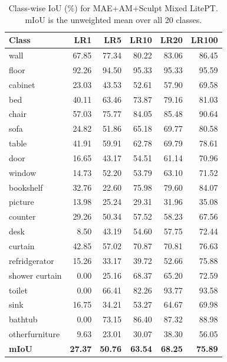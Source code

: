 \begin{table}[htbp]
\centering
\caption{Class-wise IoU (\%) for MAE+AM+Sculpt Mixed LitePT. mIoU is the unweighted mean over all 20 classes.}
\label{tab:classwise-pretrain-sculptor-litept}
\begin{tabular}{lrrrrr}
\hline
Class & LR1 & LR5 & LR10 & LR20 & LR100 \\
\hline
wall & 67.85 & 77.34 & 80.22 & 83.06 & 86.45 \\
floor & 92.26 & 94.50 & 95.33 & 95.33 & 95.59 \\
cabinet & 23.03 & 43.53 & 52.61 & 57.90 & 69.58 \\
bed & 40.11 & 63.46 & 73.87 & 79.16 & 81.03 \\
chair & 57.03 & 75.77 & 84.05 & 85.48 & 90.64 \\
sofa & 24.82 & 51.86 & 65.18 & 69.77 & 80.58 \\
table & 41.91 & 59.91 & 62.78 & 69.79 & 78.61 \\
door & 16.65 & 43.17 & 54.51 & 61.14 & 70.96 \\
window & 14.73 & 52.20 & 53.79 & 63.10 & 71.52 \\
bookshelf & 32.76 & 22.60 & 75.98 & 79.60 & 84.07 \\
picture & 13.98 & 25.24 & 29.31 & 31.96 & 35.08 \\
counter & 29.26 & 50.34 & 57.52 & 58.23 & 67.56 \\
desk & 8.50 & 43.19 & 54.60 & 57.75 & 72.44 \\
curtain & 42.85 & 57.02 & 70.87 & 70.81 & 76.63 \\
refridgerator & 15.26 & 33.17 & 39.72 & 52.66 & 75.88 \\
shower curtain & 0.00 & 25.16 & 68.37 & 65.20 & 72.59 \\
toilet & 0.00 & 66.41 & 82.26 & 93.77 & 93.58 \\
sink & 16.75 & 34.21 & 53.27 & 64.67 & 69.98 \\
bathtub & 0.00 & 73.15 & 86.40 & 87.32 & 88.98 \\
otherfurniture & 9.63 & 23.01 & 30.07 & 38.30 & 56.05 \\
\hline
\textbf{mIoU} & \textbf{27.37} & \textbf{50.76} & \textbf{63.54} & \textbf{68.25} & \textbf{75.89} \\
\hline
\end{tabular}
\end{table}
